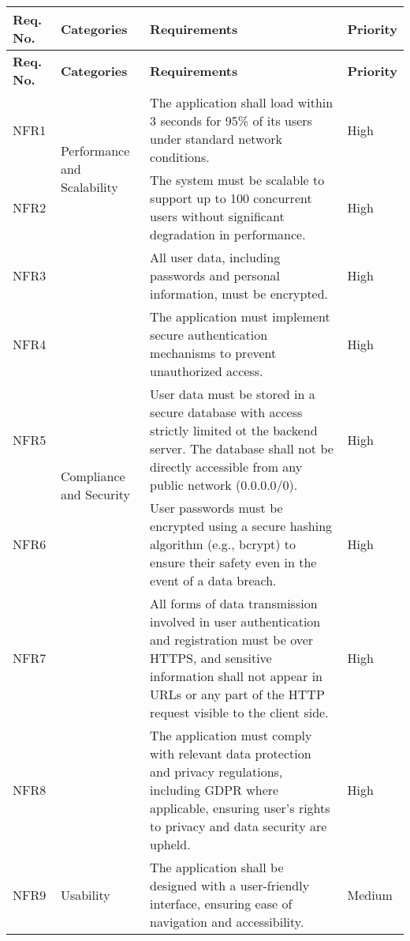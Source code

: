 \begin{longtable}{ |m{1.5cm}|m{3.5cm}|m{7cm}|m{1.5cm}| }
    \hline
    \rowcolor{lightgray}
    \textbf{Req. No.} & \textbf{Categories} & \textbf{Requirements} & \textbf{Priority} \\
    \hline
    \endfirsthead

    \hline
    \rowcolor{lightgray}
    \textbf{Req. No.} & \textbf{Categories} & \textbf{Requirements} & \textbf{Priority} \\
    \hline
    \endhead
    NFR1 & \multirow{2}{=}{Performance and Scalability} & The application shall load within 3 seconds for 95\% of its users under standard network conditions. & High \\
    \cline{1-1} \cline{3-4}
    NFR2 &  & The system must be scalable to support up to 100 concurrent users without significant degradation in performance. & High \\
    \hline
    NFR3 & \multirow{5}{=}{Compliance and Security} & All user data, including passwords and personal information, must be encrypted. & High \\
    \cline{1-1} \cline{3-4}
    NFR4 &  & The application must implement secure authentication mechanisms to prevent unauthorized access. & High \\
    \cline{1-1} \cline{3-4}
    NFR5 &  & User data must be stored in a secure database with access strictly limited ot the backend server. The database shall not be directly accessible from any public network (0.0.0.0/0). & High \\
    \cline{1-1} \cline{3-4}
    NFR6 &  & User passwords must be encrypted using a secure hashing algorithm (e.g., bcrypt) to ensure their safety even in the event of a data breach. & High \\
    \cline{1-1} \cline{3-4}
    NFR7 &  & All forms of data transmission involved in user authentication and registration must be over HTTPS, and sensitive information shall not appear in URLs or any part of the HTTP request visible to the client side. & High \\
    \cline{1-1} \cline{3-4}
    NFR8 &  & The application must comply with relevant data protection and privacy regulations, including GDPR where applicable, ensuring user's rights to privacy and data security are upheld. & High \\
    \hline
    NFR9 & \multirow{2}{=}{Usability} & The application shall be designed with a user-friendly interface, ensuring ease of navigation and accessibility. & Medium \\

\end{longtable}
